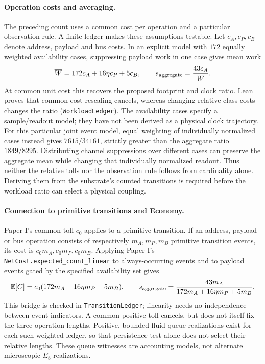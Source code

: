 \paragraph{Operation costs and averaging.}
The preceding count uses a common cost per operation and a particular
observation rule. A finite ledger makes these assumptions testable. Let
$c_A,c_P,c_B$ denote address, payload and bus costs. In an explicit model with
$172$ equally weighted availability cases, suppressing payload work in one
case gives mean work
\begin{equation}
 \overline W=172c_A+16\eta c_P+5c_B,
 \qquad s_{\rm aggregate}=\frac{43c_A}{\overline W}.
\end{equation}
At common unit cost this recovers the proposed footprint and clock ratio.
Lean proves that common cost rescaling cancels, whereas changing relative
class costs changes the ratio (\texttt{WorkloadLedger}). The availability
cases specify a sample/readout model; they have not been derived as a physical
clock trajectory. For this particular joint event model, equal weighting of individually normalized
cases instead gives $7615/34161$, strictly greater than the aggregate ratio
$1849/8295$. Distributing channel suppressions over different cases can preserve
the aggregate mean while changing that individually normalized readout.
Thus neither the relative tolls nor the observation rule follows from cardinality
alone. Deriving them from the substrate's counted transitions is required before
the workload ratio can select a physical coupling.

\paragraph{Connection to primitive transitions and Economy.}
Paper I's common toll $c_0$ applies to a primitive transition. If an address,
payload or bus operation consists of respectively $m_A,m_P,m_B$ primitive
transition events, its cost is $c_0m_A,c_0m_P,c_0m_B$. Applying Paper I's
\texttt{NetCost.expected\_count\_linear} to always-occurring events and to
payload events gated by the specified availability set gives
\begin{equation}
 \mathbb E[C]=c_0(172m_A+16\eta m_P+5m_B),\qquad
 s_{\rm aggregate}=\frac{43m_A}{172m_A+16\eta m_P+5m_B}.
\end{equation}
This bridge is checked in \texttt{TransitionLedger}; linearity needs no
independence between event indicators. A common positive toll cancels, but does
not itself fix the three operation lengths. Positive, bounded fluid-queue
realizations exist for each such weighted ledger, so that persistence test alone
does not select their relative lengths. These queue witnesses are accounting
models, not alternate microscopic $E_8$ realizations.

